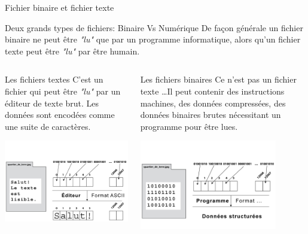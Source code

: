 \begin{frame}{Fichier binaire et fichier texte}
  \begin{block}{Deux grands types de fichiers: Binaire Vs Numérique}
    De façon générale un fichier binaire ne peut être \textit{"lu"} que
    par un programme informatique, alors qu'un fichier texte peut être
    \textit{"lu"} par être humain.
  \end{block}
  \begin{columns}
    \begin{column}{6cm}
      \begin{block}{Les fichiers textes}
        C'est un fichier qui peut être \textit{"lu"} par un éditeur de
        texte brut. Les données sont encodées comme une suite de
        caractères.
      \end{block}
      \includegraphics[width=6cm]{img/s03/fichier_1_3.jpg}
    \end{column}
    \begin{column}{6cm}
      \begin{block}{Les fichiers binaires}
        Ce n'est pas un fichier texte \dots Il peut contenir des
        instructions machines, des données compressées, des données
        binaires brutes nécessitant un programme pour être lues.
      \end{block}
      \includegraphics[width=6cm]{img/s03/fichier_1_4.jpg}
    \end{column}
  \end{columns}
\end{frame}

